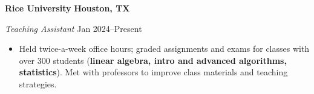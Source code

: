 \textbf{Rice University} \hfill \textbf{Houston, TX}\par
\textit{Teaching Assistant} \hfill Jan 2024--Present

\begin{itemize}
	\item Held twice-a-week office hours; graded assignments and exams for classes with over 300 students (\textbf{linear algebra, intro and advanced algorithms, statistics}). Met with professors to improve class materials and teaching strategies.
\end{itemize}\par

